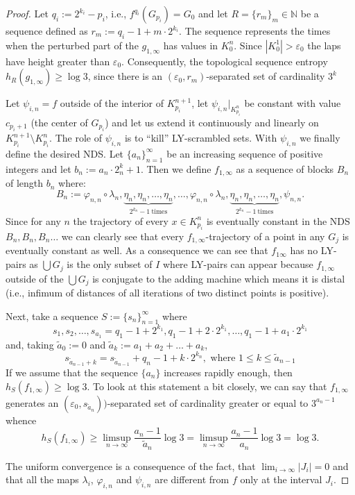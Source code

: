 \documentclass{amsart}
\begin{document}
\begin{proof}
Let $q_i := 2^{k_i}-p_i$, i.e., $f^{q_i}(G_{p_i}) = G_0$ and let $R = \{r_m\}_m\in\mathbb{N}$ be a sequence defined as $r_m := q_i - 1 + m\cdot2^{k_i}$. The sequence represents the times when the perturbed part of the $g_{1,\infty}$ has values in $K^n_0$. Since $|K^1_0| > \varepsilon_0$ the laps have height greater than $\varepsilon_0$. Consequently, the topological sequence entropy $h_R(g_{1,\infty}) \geq \log 3$, since there is an $(\varepsilon_0,r_m)$-separated set of cardinality $3^k$

Let $\psi_{i,n} = f$ outside of the interior of $K_{p_i}^{n+1}$, let $\psi_{i,n}|_{K_{p_i}^n}$ be constant with value $c_{p_i+1}$ (the center of $G_{p_i}$) and let us extend it continuously and linearly on $K_{p_i}^{n+1}\setminus K_{p_i}^{n}$. The role of $\psi_{i,n}$ is to ``kill'' LY-scrambled sets. With $\psi_{i,n}$ we finally define the desired NDS. Let $\{a_n\}_{n=1}^\infty$ be an increasing sequence of positive integers and let $b_n := a_n\cdot 2^k_n +1$. Then we define $f_{1,\infty}$ as a sequence of blocks $B_n$ of length $b_n$ where: $$B_n := \varphi_{n,n}\circ\lambda_n, \underbrace{\eta_n,\eta_n, \ldots, \eta_n}_{2^{k_n}-1\ \mbox{times}}, \ldots, \varphi_{n,n}\circ\lambda_n, \underbrace{\eta_n,\eta_n, \ldots, \eta_n}_{2^{k_n}-1\ \mbox{times}}, \psi_{n,n}.$$
Since for any $n$ the trajectory of every $x\in K_{p_i}^n$ is eventually constant in the NDS $B_n,B_n,B_n\ldots$ we can clearly see that every $f_{1,\infty}$-trajectory of a point in any $G_j$ is eventually constant as well. As a consequence we can see that $f_{1\infty}$ has no LY-pairs as $\bigcup G_j$ is the only subset of $I$ where LY-pairs can appear because $f_{1,\infty}$ outside of the $\bigcup G_j$ is conjugate to the adding machine which means it is distal (i.e., infimum of distances of all iterations of two distinct points is positive).

Next, take a sequence $S := \{s_n\}_{n=1}^\infty$ where $$s_1,s_2,\ldots, s_{a_1} = q_1 - 1 + 2^{k_1}, q_1 - 1 + 2\cdot 2^{k_1}, \ldots, q_1 - 1 + a_1\cdot 2^{k_1}$$
and, taking $\tilde{a}_0 := 0$ and $\tilde{a}_k := a_1 + a_2 + \ldots + a_k$, $$s_{\tilde{a}_{n-1}+k} = s_{\tilde{a}_{n-1}} + q_n - 1 +k\cdot 2^{k_n}, \mbox{ where } 1 \leq k \leq \tilde{a}_{n-1}$$
If we assume that the sequence $\{a_n\}$ increases rapidly enough, then $h_S(f_{1,\infty}) \geq \log 3$. To look at this statement a bit closely, we can say that $f_{1,\infty}$ generates an $(\varepsilon_0,s_{\tilde{a}_n}))$-separated set of cardinality greater or equal to $3^{a_n-1}$ whence
$$h_S(f_{1,\infty}) \geq \limsup_{n\rightarrow\infty} \frac{a_n-1}{\tilde{a}_n}\log 3 = \limsup_{n\rightarrow\infty} \frac{a_n-1}{a_n}\log 3 = \log 3.$$

The uniform convergence is a consequence of the fact, that $\lim_{i \rightarrow \infty}|J_i| = 0$ and that all the maps $\lambda_i$, $\varphi_{i,n}$ and $\psi_{i,n}$ are different from $f$ only at the interval $J_i$.

\end{proof}
\end{document}
